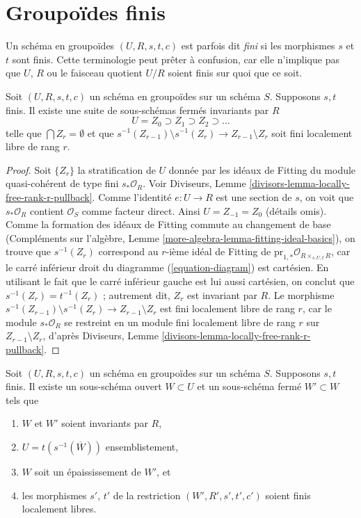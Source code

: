 \section{Groupoïdes finis}
\label{section-finite-groupoids}

\noindent
Un schéma en groupoïdes $(U, R, s, t, c)$ est parfois dit {\it fini} si les
morphismes $s$ et $t$ sont finis. Cette terminologie peut prêter à confusion, car elle
n'implique pas que $U$, $R$ ou le faisceau quotient $U/R$ soient finis sur quoi que ce soit.

\begin{lemma}
\label{lemma-finite-stratify}
Soit $(U, R, s, t, c)$ un schéma en groupoïdes sur un schéma $S$. Supposons $s, t$
finis. Il existe une suite de sous-schémas fermés invariants par $R$
$$
U = Z_0 \supset Z_1 \supset Z_2 \supset \ldots
$$
telle que $\bigcap Z_r = \emptyset$ et que
$s^{-1}(Z_{r - 1}) \setminus s^{-1}(Z_r) \to Z_{r - 1} \setminus Z_r$
soit fini localement libre de rang $r$.
\end{lemma}

\begin{proof}
Soit $\{Z_r\}$ la stratification de $U$ donnée par les idéaux de Fitting
du module quasi-cohérent de type fini $s_*\mathcal{O}_R$. Voir
Diviseurs, Lemme \ref{divisors-lemma-locally-free-rank-r-pullback}.
Comme l'identité $e : U \to R$ est une section de $s$, on voit que
$s_*\mathcal{O}_R$ contient $\mathcal{O}_S$ comme facteur direct.
Ainsi $U = Z_{-1} = Z_0$ (détails omis).
Comme la formation des idéaux de Fitting commute au changement de base
(Compléments sur l'algèbre, Lemme \ref{more-algebra-lemma-fitting-ideal-basics}),
on trouve que $s^{-1}(Z_r)$ correspond au $r$-ième idéal de Fitting
de $\text{pr}_{1, *}\mathcal{O}_{R \times_{s, U, t} R}$, car
le carré inférieur droit du diagramme (\ref{equation-diagram}) est cartésien.
En utilisant le fait que le carré inférieur gauche est lui aussi cartésien, on conclut
que $s^{-1}(Z_r) = t^{-1}(Z_r)$ ; autrement dit, $Z_r$ est invariant par $R$.
Le morphisme
$s^{-1}(Z_{r - 1}) \setminus s^{-1}(Z_r) \to Z_{r - 1} \setminus Z_r$
est fini localement libre de rang $r$, car le module
$s_*\mathcal{O}_R$ se restreint en un module fini localement libre de rang $r$
sur $Z_{r - 1} \setminus Z_r$, d'après
Diviseurs, Lemme \ref{divisors-lemma-locally-free-rank-r-pullback}.
\end{proof}

\begin{lemma}
\label{lemma-finite-flat-over-almost-dense-subscheme}
Soit $(U, R, s, t, c)$ un schéma en groupoïdes sur un schéma $S$. Supposons $s, t$
finis. Il existe un sous-schéma ouvert $W \subset U$ et un sous-schéma fermé
$W' \subset W$ tels que
\begin{enumerate}
\item $W$ et $W'$ soient invariants par $R$,
\item $U = t(s^{-1}(\overline{W}))$ ensemblistement,
\item $W$ soit un épaississement de $W'$, et
\item les morphismes $s'$, $t'$ de la restriction $(W', R', s', t', c')$
soient finis localement libres.
\end{enumerate}
\end{lemma}

